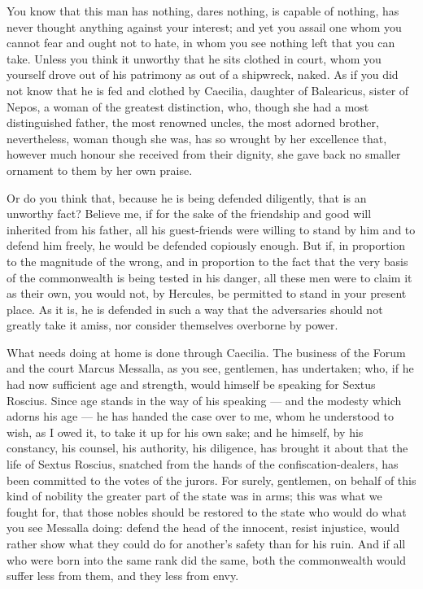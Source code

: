  You know that this man has nothing, dares nothing, is capable of nothing, has never thought anything against your interest; and yet you assail one whom you cannot fear and ought not to hate, in whom you see nothing left that you can take. Unless you think it unworthy that he sits clothed in court, whom you yourself drove out of his patrimony as out of a shipwreck, naked. As if you did not know that he is fed and clothed by Caecilia, daughter of Balearicus, sister of Nepos, a woman of the greatest distinction, who, though she had a most distinguished father, the most renowned uncles, the most adorned brother, nevertheless, woman though she was, has so wrought by her excellence that, however much honour she received from their dignity, she gave back no smaller ornament to them by her own praise.

 Or do you think that, because he is being defended diligently, that is an unworthy fact? Believe me, if for the sake of the friendship and good will inherited from his father, all his guest-friends were willing to stand by him and to defend him freely, he would be defended copiously enough. But if, in proportion to the magnitude of the wrong, and in proportion to the fact that the very basis of the commonwealth is being tested in his danger, all these men were to claim it as their own, you would not, by Hercules, be permitted to stand in your present place. As it is, he is defended in such a way that the adversaries should not greatly take it amiss, nor consider themselves overborne by power.

 What needs doing at home is done through Caecilia. The business of the Forum and the court Marcus Messalla, as you see, gentlemen, has undertaken; who, if he had now sufficient age and strength, would himself be speaking for Sextus Roscius. Since age stands in the way of his speaking --- and the modesty which adorns his age --- he has handed the case over to me, whom he understood to wish, as I owed it, to take it up for his own sake; and he himself, by his constancy, his counsel, his authority, his diligence, has brought it about that the life of Sextus Roscius, snatched from the hands of the confiscation-dealers, has been committed to the votes of the jurors. For surely, gentlemen, on behalf of this kind of nobility the greater part of the state was in arms; this was what we fought for, that those nobles should be restored to the state who would do what you see Messalla doing: defend the head of the innocent, resist injustice, would rather show what they could do for another's safety than for his ruin. And if all who were born into the same rank did the same, both the commonwealth would suffer less from them, and they less from envy.

